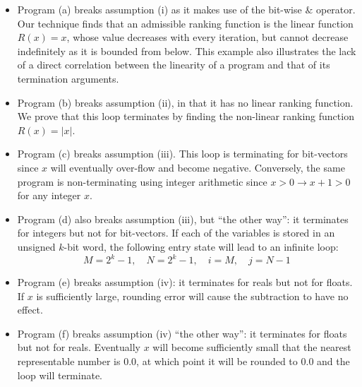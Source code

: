 \documentclass[preprint]{sigplanconf}
\theoremstyle{definition}
\begin{document}
%
\begin{itemize}

\item Program (a) breaks assumption (i) as it makes use of the bit-wise $\&$ operator.
%
Our technique finds that an admissible ranking function is the linear
function $R(x) = x$, whose value decreases with every iteration, but cannot
decrease indefinitely as it is bounded from below.  This example also
illustrates the lack of a direct correlation between the linearity of a
program and that of its termination arguments.

\item Program (b) breaks assumption (ii), in that it has no linear ranking
function.  We prove that this loop terminates by finding the non-linear
ranking function $R(x) = |x|$.

\item Program (c) breaks assumption (iii).  This loop is terminating for
bit-vectors since $x$ will eventually over-flow and become negative. 
Conversely, the same program is non-terminating using integer arithmetic
since $x > 0 \rightarrow x+1 > 0$ for any integer $x$.

\item Program (d) also breaks assumption (iii), but ``the other way'': it
terminates for integers but not for bit-vectors.  If each of the variables
is stored in an unsigned $k$-bit word, the following entry state will lead
to an infinite loop:
%
$$ M = 2^k - 1,\quad N = 2^k - 1,\quad i = M,\quad j = N-1 $$

\item Program (e) breaks assumption (iv): it terminates for reals but not
for floats.  If $x$ is sufficiently large, rounding error will cause the
subtraction to have no effect.

\item Program (f) breaks assumption (iv) ``the other way'': it terminates
for floats but not for reals.  Eventually $x$ will become sufficiently small
that the nearest representable number is $0.0$, at which point it will be
rounded to $0.0$ and the loop will terminate.

\end{itemize}
\end{document}
